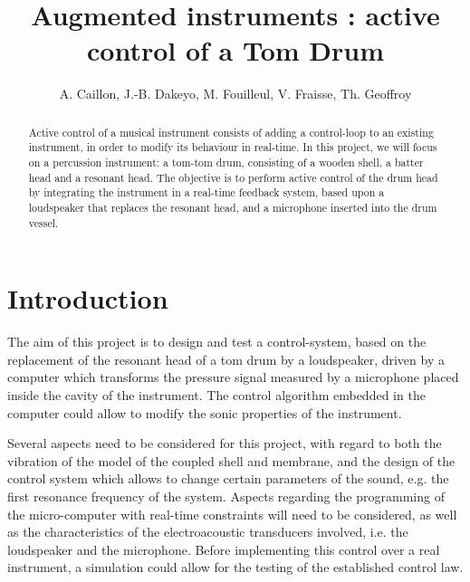 \documentclass[11pt, twocolumn]{article}
\title{\textbf{Augmented instruments : active control of a Tom Drum}}
\author{A. Caillon, J.-B. Dakeyo, M. Fouilleul, V. Fraisse, Th. Geoffroy}
\begin{document}
\maketitle

 

\begin{abstract}

 Active control of a musical instrument consists of adding a control-loop to an existing instrument, in order to modify its behaviour in real-time. In this project, we will focus on a percussion instrument: a tom-tom drum, consisting of a wooden shell, a batter head and a resonant head. The objective is to perform active control of the drum head by integrating the instrument in a real-time feedback system, based upon a loudspeaker that replaces the resonant head, and a microphone inserted into the drum vessel.

\end{abstract}

\section*{Introduction}

The aim of this project is to design and test a control-system, based on the replacement of the resonant head of a tom drum by a loudspeaker, driven by a computer which transforms the pressure signal measured by a microphone placed inside the cavity of the instrument.
The control algorithm embedded in the computer could allow to modify the sonic properties of the instrument.

Several aspects need to be considered for this project, with regard to both the vibration of the model of the coupled shell and membrane, and the design of the control system which allows to change certain parameters of the sound, e.g. the first resonance frequency of the system. Aspects regarding the programming of the micro-computer with real-time constraints will need to be considered, as well as the characteristics of the electroacoustic transducers involved, i.e. the loudspeaker and the microphone. Before implementing this control over a real instrument, a simulation could allow for the testing of the established control law.
\end{document}
